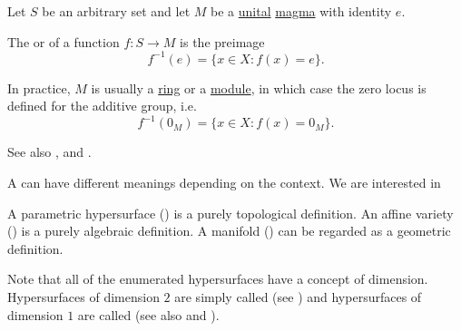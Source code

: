 \begin{definition}\label{def:zero_locus}
  Let \( S \) be an arbitrary set and let \( M \) be a \hyperref[def:unital_magma]{unital} \hyperref[def:magma]{magma} with identity \( e \).

  The  or  of a function \( f: S \to M \) is the preimage
  \begin{equation*}
    f^{-1}(e) = \{ x \in X \colon f(x) = e \}.
  \end{equation*}

  In practice, \( M \) is usually a \hyperref[def:semiring/ring]{ring} or a \hyperref[def:left_module]{module}, in which case the zero locus is defined for the additive group, i.e.
  \begin{equation*}
    f^{-1}(0_M) = \{ x \in X \colon f(x) = 0_M \}.
  \end{equation*}

  See also ,  and .
\end{definition}

\begin{definition}\label{def:hypersurface}
  A  can have different meanings depending on the context. We are interested in

  \begin{thmenum}
     A parametric hypersurface () is a purely topological definition.
     An affine variety () is a purely algebraic definition.
     A manifold () can be regarded as a geometric definition.
  \end{thmenum}

  Note that all of the enumerated hypersurfaces have a concept of dimension. Hypersurfaces of dimension \( 2 \) are simply called  (see ) and hypersurfaces of dimension \( 1 \) are called  (see also  and ).
\end{definition}

